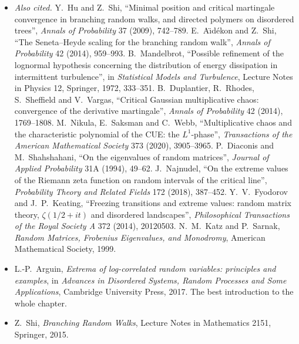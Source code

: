 \begin{itemize}
K.~Soundararajan, ``Maximum of the Riemann zeta function on a short interval of the critical line'', \emph{Communications on Pure and Applied Mathematics} 72 (2019), 500--535. L.-P.~Arguin, P.~Bourgade and M.~Radziwi\l\l, ``The
Fyodorov--Hiary--Keating conjecture. I'' (2020, arXiv:2007.00988) and ``II'' (2023, arXiv:2307.00982).
\item \emph{Also cited.} Y.~Hu and Z.~Shi, ``Minimal position and critical martingale convergence in branching random walks, and directed polymers on disordered trees'', \emph{Annals of Probability} 37 (2009), 742--789. E.~A\"\i d\'ekon and Z.~Shi, ``The Seneta--Heyde scaling for the branching random walk'', \emph{Annals of Probability} 42 (2014), 959--993. B.~Mandelbrot, ``Possible refinement of the lognormal hypothesis concerning the distribution of energy dissipation in intermittent turbulence'', in \emph{Statistical Models and Turbulence}, Lecture Notes in Physics 12, Springer, 1972, 333--351. B.~Duplantier, R.~Rhodes, S.~Sheffield and V.~Vargas, ``Critical Gaussian multiplicative chaos: convergence of the derivative martingale'', \emph{Annals of Probability} 42 (2014), 1769--1808. M.~Nikula, E.~Saksman and C.~Webb, ``Multiplicative chaos and the characteristic polynomial of the CUE: the $L^1$-phase'', \emph{Transactions of the American Mathematical Society} 373 (2020), 3905--3965. P.~Diaconis and M.~Shahshahani, ``On the eigenvalues of random matrices'', \emph{Journal of Applied Probability} 31A (1994), 49--62. J.~Najnudel, ``On the extreme values of the Riemann zeta function on random intervals of the critical line'', \emph{Probability Theory and Related Fields} 172 (2018), 387--452. Y.~V.~Fyodorov and J.~P.~Keating, ``Freezing transitions and extreme values: random matrix theory, $\zeta(1/2+it)$ and disordered landscapes'', \emph{Philosophical Transactions of the Royal Society A} 372 (2014), 20120503. N.~M.~Katz and P.~Sarnak, \emph{Random Matrices, Frobenius Eigenvalues, and Monodromy}, American Mathematical Society, 1999.
\item L.-P.~Arguin, \emph{Extrema of log-correlated random variables: principles and examples}, in \emph{Advances in Disordered Systems, Random Processes and Some Applications}, Cambridge University Press, 2017. The best introduction to the
whole chapter.
\item Z.~Shi, \emph{Branching Random Walks}, Lecture Notes in Mathematics 2151, Springer, 2015.
\end{itemize}
